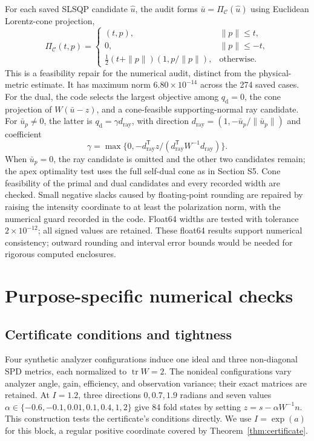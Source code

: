 For each saved SLSQP candidate $\widehat u$, the audit forms $\bar u=\Pi_{\mathcal C}(\widehat u)$ using Euclidean Lorentz-cone projection,
\begin{equation}
 \Pi_{\mathcal C}(t,p)=
 \begin{cases}
 (t,p),&\|p\|\leq t,\\
 0,&\|p\|\leq-t,\\
 \tfrac12(t+\|p\|)(1,p/\|p\|),&\text{otherwise}.
 \end{cases}
 \label{eq:euclideancone}
\end{equation}
This is a feasibility repair for the numerical audit, distinct from the physical-metric estimate. It has maximum norm $6.80\times10^{-14}$ across the 274 saved cases. For the dual, the code selects the largest objective among $q_{\mathrm d}=0$, the cone projection of $W(\bar u-z)$, and a cone-feasible supporting-normal ray candidate. For $\bar u_p\ne0$, the latter is $q_{\mathrm d}=\gamma d_{\mathrm{ray}}$, with direction $d_{\mathrm{ray}}=(1,-\bar u_p/\|\bar u_p\|)$ and coefficient
\begin{equation}
 \gamma=\max\{0,-d_{\mathrm{ray}}^{\mathsf T}z/(d_{\mathrm{ray}}^{\mathsf T}W^{-1}d_{\mathrm{ray}})\}.
 \label{eq:dualcandidate}
\end{equation}
When $\bar u_p=0$, the ray candidate is omitted and the other two candidates remain; the apex optimality test uses the full self-dual cone as in Section S5. Cone feasibility of the primal and dual candidates and every recorded width are checked. Small negative slacks caused by floating-point rounding are repaired by raising the intensity coordinate to at least the polarization norm, with the numerical guard recorded in the code. Float64 widths are tested with tolerance $2\times10^{-12}$; all signed values are retained. These float64 results support numerical consistency; outward rounding and interval error bounds would be needed for rigorous computed enclosures.

\section{Purpose-specific numerical checks}
\subsection{Certificate conditions and tightness}
Four synthetic analyzer configurations induce one ideal and three non-diagonal SPD metrics, each normalized to $\operatorname{tr}W=2$. The nonideal configurations vary analyzer angle, gain, efficiency, and observation variance; their exact matrices are retained. At $I=1.2$, three directions $0,0.7,1.9$ radians and seven values $\alpha\in\{-0.6,-0.1,0.01,0.1,0.4,1,2\}$ give 84 fold states by setting $z=s-\alpha W^{-1}n$. This construction tests the certificate's conditions directly. We use $I=\exp(a)$ for this block, a regular positive coordinate covered by Theorem~\ref{thm:certificate}.

